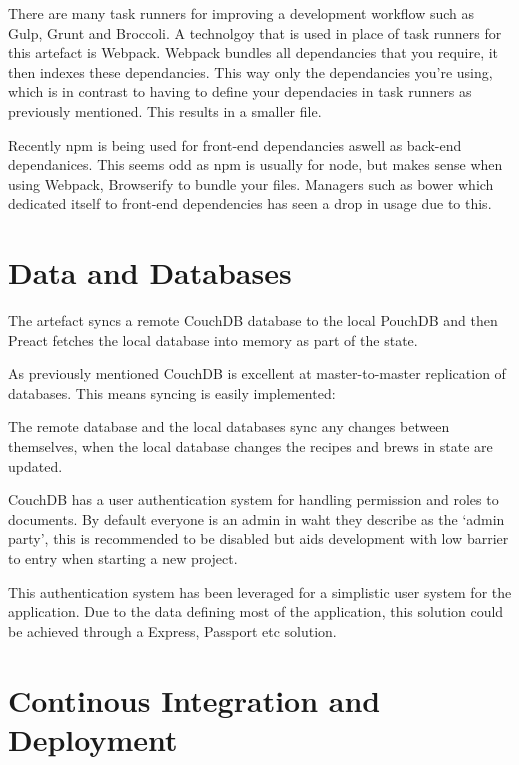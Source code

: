 There are many task runners for improving a development workflow such as Gulp, Grunt and Broccoli. A technolgoy that is used in place of task runners for this artefact is Webpack. Webpack bundles all dependancies that you require, it then indexes these dependancies. This way only the dependancies you're using, which is in contrast to having to define your dependacies in task runners as previously mentioned. This results in a smaller file. %

Recently npm is being used for front-end dependancies aswell as back-end dependanices. This seems odd as npm is usually for node, but makes sense when using Webpack, Browserify to bundle your files. Managers such as bower which dedicated itself to front-end dependencies has seen a drop in usage due to this. %


\section{Data and Databases}

The artefact syncs a remote CouchDB database to the local PouchDB and then Preact fetches the local database into memory as part of the state.

As previously mentioned CouchDB is excellent at master-to-master replication of databases. This means syncing is easily implemented:


The remote database and the local databases sync any changes between themselves, when the local database changes the recipes and brews in state are updated.

CouchDB has a user authentication system for handling permission and roles to documents. By default everyone is an admin in waht they describe as the `admin party', this is recommended to be disabled but aids development with low barrier to entry when starting a new project.

This authentication system has been leveraged for a simplistic user system for the application. Due to the data defining most of the application, this solution could be achieved through a Express, Passport etc solution.


\section{Continous Integration and Deployment}

